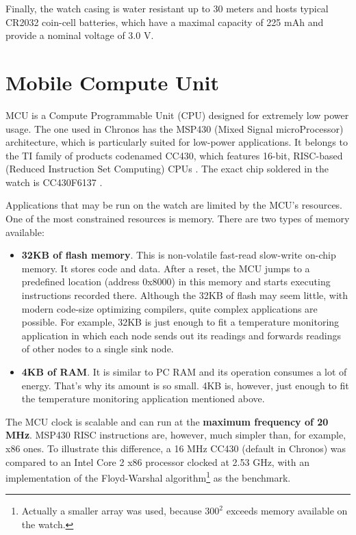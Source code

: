 Finally, the watch casing is water resistant up to 30 meters and hosts
typical CR2032 coin-cell batteries, which have a maximal capacity of
225 mAh and provide a nominal voltage of 3.0 V.

\section{Mobile Compute Unit}

MCU is a Compute Programmable Unit (CPU) designed for extremely
low power usage. The one used in Chronos has the MSP430 (Mixed Signal
microProcessor) architecture, which is particularly suited for
low-power applications. It belongs to the TI family of products
codenamed CC430, which features 16-bit, RISC-based (Reduced Instruction
Set Computing) CPUs \cite{CC430ds}. The exact chip soldered in the
watch is CC430F6137 \cite{CC430F6137ds}.

Applications that may be run on the watch are limited by the MCU's
resources. One of the most constrained resources is memory. There are two types
of memory available:
\begin{itemize}
  \item {\bf 32KB of flash memory}. This is non-volatile fast-read
    slow-write on-chip memory. It stores code and data. After a reset,
    the MCU jumps to a predefined location (address 0x8000) in this
    memory and starts executing instructions recorded there. Although
    the 32KB of flash may seem little, with modern code-size
    optimizing compilers, quite complex applications are possible. For
    example, 32KB is just enough to fit a temperature monitoring
    application in which each node sends out its readings and forwards
    readings of other nodes to a single sink node.
  \item {\bf 4KB of RAM}. It is similar to PC RAM and its
    operation consumes a lot of energy. That's why its amount is so
    small. 4KB is, however, just enough to fit the temperature monitoring
    application mentioned above.
\end{itemize}

The MCU clock is scalable and can run at the {\bf maximum frequency of
20 MHz}.  MSP430 RISC instructions are, however, much simpler than, for
example, x86 ones. To illustrate this difference, a 16 MHz CC430 (default
in Chronos) was compared to an Intel Core 2 x86 processor clocked at
2.53 GHz, with an implementation of the Floyd-Warshal
algorithm\footnote{Actually a smaller array was used, because $300^2$
exceeds memory available on the watch.} as the benchmark.

